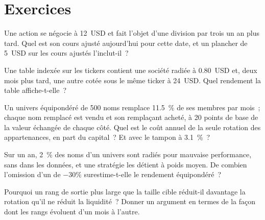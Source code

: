 \section{Exercices}

\begin{exercise}[$\star$]\label{exo:rs:universe-symbology-and-corporate-actions:1}
Une action se négocie à 12~USD et fait l'objet d'une division par trois un an plus tard. Quel est son cours ajusté aujourd'hui pour cette date, et un
plancher de 5~USD sur les cours ajustés l'inclut-il~?
\end{exercise}

\begin{exercise}[$\star$]\label{exo:rs:universe-symbology-and-corporate-actions:2}
Une table indexée sur les tickers contient une société radiée à 0.80~USD et, deux mois plus tard, une autre cotée sous le même ticker
à 24~USD. Quel rendement la table affiche-t-elle~?
\end{exercise}

\begin{exercise}[$\star$]\label{exo:rs:universe-symbology-and-corporate-actions:3}
Un univers équipondéré de 500 noms remplace 11.5~\% de ses membres par mois~; chaque nom remplacé est vendu et son remplaçant
acheté, à 20 points de base de la valeur échangée de chaque côté. Quel est le coût annuel de la seule rotation des appartenances, en part du capital~?
Et avec le tampon à 3.1~\%~?
\end{exercise}

\begin{exercise}[$\star\star$]\label{exo:rs:universe-symbology-and-corporate-actions:4}
Sur un an, 2~\% des noms d'un univers sont radiés pour mauvaise performance, sans  dans les données, et une stratégie les détient
à poids moyen. De combien l'omission d'un  de $-30\%$ surestime-t-elle le rendement équipondéré~?
\end{exercise}

\begin{exercise}[$\star\star$]\label{exo:rs:universe-symbology-and-corporate-actions:5}
Pourquoi un rang de sortie plus large que la taille cible réduit-il davantage la rotation qu'il ne réduit la liquidité~? Donner un argument en termes de la façon dont les rangs
évoluent d'un mois à l'autre.
\end{exercise}

